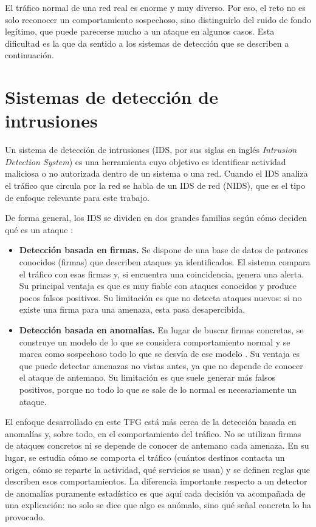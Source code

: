 El tráfico normal de una red real es enorme y muy diverso. Por eso, el reto no es solo reconocer un comportamiento sospechoso, sino distinguirlo del ruido de fondo legítimo, que puede parecerse mucho a un ataque en algunos casos. Esta dificultad es la que da sentido a los sistemas de detección que se describen a continuación.

\section{Sistemas de detección de intrusiones}
\label{sec:concep_ids}

Un sistema de detección de intrusiones (IDS, por sus siglas en inglés \emph{Intrusion Detection System}) es una herramienta cuyo objetivo es identificar actividad maliciosa o no autorizada dentro de un sistema o una red. Cuando el IDS analiza el tráfico que circula por la red se habla de un IDS de red (NIDS), que es el tipo de enfoque relevante para este trabajo.

De forma general, los IDS se dividen en dos grandes familias según cómo deciden qué es un ataque \cite{garciateodoro2009anomaly}:

\begin{itemize}
  \item \textbf{Detección basada en firmas.} Se dispone de una base de datos de patrones conocidos (firmas) que describen ataques ya identificados. El sistema compara el tráfico con esas firmas y, si encuentra una coincidencia, genera una alerta. Su principal ventaja es que es muy fiable con ataques conocidos y produce pocos falsos positivos. Su limitación es que no detecta ataques nuevos: si no existe una firma para una amenaza, esta pasa desapercibida.
  \item \textbf{Detección basada en anomalías.} En lugar de buscar firmas concretas, se construye un modelo de lo que se considera comportamiento normal y se marca como sospechoso todo lo que se desvía de ese modelo \cite{chandola2009anomaly}. Su ventaja es que puede detectar amenazas no vistas antes, ya que no depende de conocer el ataque de antemano. Su limitación es que suele generar más falsos positivos, porque no todo lo que se sale de lo normal es necesariamente un ataque.
\end{itemize}

El enfoque desarrollado en este TFG está más cerca de la detección basada en anomalías y, sobre todo, en el comportamiento del tráfico. No se utilizan firmas de ataques concretos ni se depende de conocer de antemano cada amenaza. En su lugar, se estudia cómo se comporta el tráfico (cuántos destinos contacta un origen, cómo se reparte la actividad, qué servicios se usan) y se definen reglas que describen esos comportamientos. La diferencia importante respecto a un detector de anomalías puramente estadístico es que aquí cada decisión va acompañada de una explicación: no solo se dice que algo es anómalo, sino qué señal concreta lo ha provocado.

